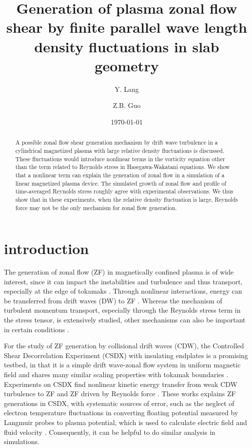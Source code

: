 \documentclass[aps,pre,twocolumn,superscriptaddress]{revtex4-2}
\begin{document}
\title{
Generation of plasma zonal flow shear by finite parallel wave length density fluctuations in slab geometry
}


\author{Y. Lang}
\author{Z.B. Guo}

\date{\today}


\begin{abstract}
A possible zonal flow shear generation mechanism by drift wave turbulence in a cylindrical magnetized plasma with large relative density fluctuations is discussed. These fluctuations would introduce nonlinear terms in the vorticity equation other than the term related to Reynolds stress in Hasegawa-Wakatani equations. We show that a nonlinear term can explain the generation of zonal flow in a simulation of a linear magnetized plasma device. The simulated growth of zonal flow and profile of time-averaged Reynolds stress roughly agree with experimental observations. We thus show that in these experiments, when the relative density fluctuation is large, Reynolds force may not be the only mechanism for zonal flow generation.
\end{abstract}
\maketitle


\section{\label{sec:introduction}introduction}
The generation of zonal flow (ZF) in magnetically confined plasma is of wide interest, since it can impact the instabilities and turbulence and thus transport, especially at the edge of tokamaks \cite{Li_2020}. Through nonlinear interactions, energy can be transferred from drift waves (DW) to ZF \cite{Diamond_2005}. Whereas the mechanism of turbulent momentum transport, especially through the Reynolds stress term in the stress tensor, is extensively studied, other mechanisms can also be important in certain conditions \cite{Diamond_2009, Diamond_2013}.

For the study of ZF generation by collisional drift waves (CDW), the Controlled Shear Decorrelation Experiment (CSDX) with insulating endplates \cite{Thakur_2013} is a promising testbed, in that it is a simple drift wave-zonal flow system \cite{Xu_2010, Hajjar_2018} in uniform magnetic field and shares many similar scaling properties with tokamak boundaries \cite{Cui_2016}. Experiments on CSDX find nonlinear kinetic energy transfer from weak CDW turbulence to ZF \cite{Xu_2009, Xu_2010} and ZF driven by Reynolds force \cite{Holland_2006,Yan_2008,Yan_2010}. These works explains ZF generations in CSDX, with systematic sources of error, such as the neglect of electron temperature fluctuations in converting floating potential measured by Langmuir probes to plasma potential, which is used to calculate electric field and fluid velocity \cite{Holland_2006,Xu_2009}. Consequently, it can be helpful to do similar analysis in simulations.
\end{document}
